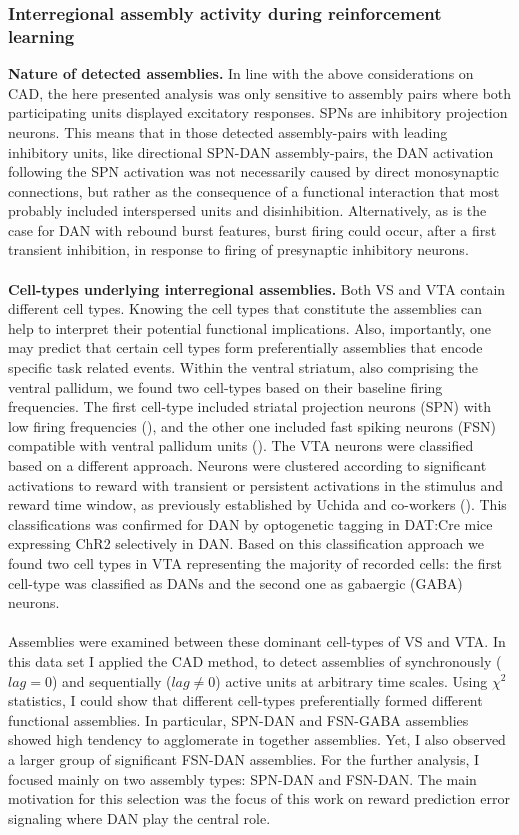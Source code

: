 \subsubsection{Interregional assembly activity during reinforcement learning}
\textbf{Nature of detected assemblies.} In line with the above considerations on CAD, the here presented analysis was only sensitive to assembly pairs where both participating units displayed excitatory responses. SPNs are inhibitory projection neurons. This means that in those detected assembly-pairs with leading inhibitory units, like directional SPN-DAN assembly-pairs, the DAN activation following the SPN activation was not necessarily caused by direct monosynaptic connections, but rather as the consequence of a functional interaction that most probably included interspersed units and disinhibition. Alternatively, as is the case for DAN with rebound burst features, burst firing could occur, after a first transient inhibition, in response to firing of presynaptic inhibitory neurons.\\\\
\textbf{Cell-types underlying interregional assemblies.} Both VS and VTA contain different cell types. Knowing the cell types that constitute the assemblies can help to interpret their potential functional implications. Also, importantly, one may predict that certain cell types form preferentially assemblies that encode specific task related events. Within the ventral striatum, also comprising the ventral pallidum, we found two cell-types based on their baseline firing frequencies. The first cell-type included striatal projection neurons (SPN) with low firing frequencies (\cite{Kravitz}), and the other one included fast spiking neurons (FSN) compatible with ventral pallidum units (\cite{Heimer1982}). The VTA neurons were classified based on a different approach. Neurons were clustered according to significant activations to reward with transient or persistent activations in the stimulus and reward time window, as previously established by Uchida and co-workers (\cite{Uchida}). This classifications was confirmed for DAN by optogenetic tagging in DAT:Cre mice expressing ChR2 selectively in DAN. Based on this classification approach we found two cell types in VTA representing the majority of recorded cells: the first cell-type was classified as DANs and the second one as gabaergic (GABA) neurons.\\\\
Assemblies were examined between these dominant cell-types of VS and VTA. In this data set I applied the CAD method, to detect assemblies of synchronously ($lag=0$) and sequentially ($lag\neq0$) active units at arbitrary time scales. Using $\chi^2$ statistics, I could show that different cell-types preferentially formed different functional assemblies. In particular, SPN-DAN and FSN-GABA assemblies showed high tendency to agglomerate in together assemblies. Yet, I also observed a larger group of significant FSN-DAN assemblies. For the further analysis, I focused mainly on two assembly types: SPN-DAN and FSN-DAN. The main motivation for this selection was the focus of this work on reward prediction error signaling where DAN play the central role.\\\\ 
